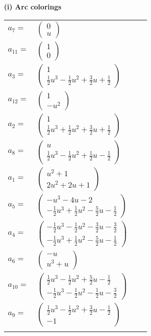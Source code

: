 \documentclass[1p]{elsarticle_modified}
\theoremstyle{definition}
\begin{document}
\flushleft \textbf{(i) Arc colorings}\\
\begin{tabular}{m{7pt} m{180pt} m{7pt} m{180pt} }
\flushright $a_{7}=$&$\begin{pmatrix}0\\u\end{pmatrix}$ \\
\flushright $a_{11}=$&$\begin{pmatrix}1\\0\end{pmatrix}$ \\
\flushright $a_{3}=$&$\begin{pmatrix}1\\\frac{1}{2} u^3-\frac{1}{2} u^2+\frac{3}{2} u+\frac{1}{2}\end{pmatrix}$ \\
\flushright $a_{12}=$&$\begin{pmatrix}1\\- u^2\end{pmatrix}$ \\
\flushright $a_{2}=$&$\begin{pmatrix}1\\\frac{1}{2} u^3+\frac{1}{2} u^2+\frac{3}{2} u+\frac{1}{2}\end{pmatrix}$ \\
\flushright $a_{8}=$&$\begin{pmatrix}u\\\frac{1}{2} u^3-\frac{1}{2} u^2+\frac{1}{2} u-\frac{1}{2}\end{pmatrix}$ \\
\flushright $a_{1}=$&$\begin{pmatrix}u^2+1\\2 u^2+2 u+1\end{pmatrix}$ \\
\flushright $a_{5}=$&$\begin{pmatrix}- u^3-4 u-2\\-\frac{1}{2} u^3+\frac{1}{2} u^2-\frac{5}{2} u-\frac{1}{2}\end{pmatrix}$ \\
\flushright $a_{4}=$&$\begin{pmatrix}-\frac{1}{2} u^3-\frac{1}{2} u^2-\frac{3}{2} u-\frac{3}{2}\\-\frac{1}{2} u^3+\frac{1}{2} u^2-\frac{5}{2} u-\frac{1}{2}\end{pmatrix}$ \\
\flushright $a_{6}=$&$\begin{pmatrix}- u\\u^3+u\end{pmatrix}$ \\
\flushright $a_{10}=$&$\begin{pmatrix}\frac{1}{2} u^3-\frac{1}{2} u^2+\frac{5}{2} u-\frac{1}{2}\\-\frac{1}{2} u^3-\frac{1}{2} u^2-\frac{1}{2} u-\frac{3}{2}\end{pmatrix}$ \\
\flushright $a_{9}=$&$\begin{pmatrix}\frac{1}{2} u^3-\frac{1}{2} u^2+\frac{3}{2} u-\frac{1}{2}\\-1\end{pmatrix}$\\&\end{tabular}
\end{document}
